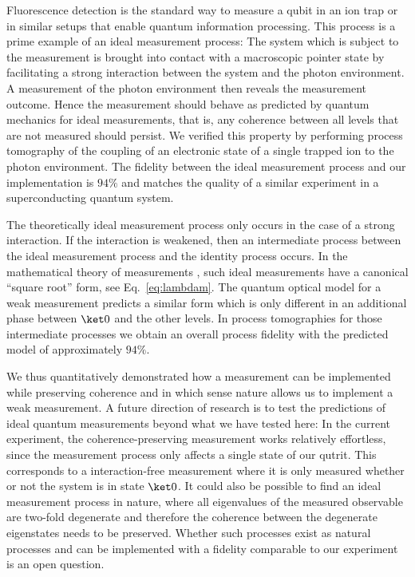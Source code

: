 \documentclass[12pt,
onecolumn,
superscriptaddress,
floatfix,
]{revtex4-2}
\begin{document}
Fluorescence detection is the standard way to measure a qubit in an ion trap or 
 in similar setups that enable quantum information processing.
This process is a prime example of an ideal measurement process:
The system which is subject to the measurement is brought into contact with a 
 macroscopic pointer state by facilitating a strong interaction between the system 
 and the photon environment.
A measurement of the photon environment then reveals the measurement outcome.
Hence the measurement should behave as predicted by quantum mechanics for 
 ideal measurements, that is, any coherence between all levels 
 that are not measured should persist.
We verified this property by 
 performing process tomography of the coupling of an electronic state of a single trapped ion to the photon environment.
The fidelity between the ideal measurement process and our implementation is 
 $94\%$ and matches the quality of a similar experiment \cite{Jerger16} in a 
 superconducting quantum system.

The theoretically ideal measurement process only occurs in the case of a strong 
 interaction.
If the interaction is weakened, then an intermediate process between the ideal 
 measurement process and the identity process occurs.
In the mathematical theory of measurements \cite{Heinosaari12}, such ideal 
 measurements have a canonical ``square root'' form, see 
 Eq.~\eqref{eq:lambdam}.
The quantum optical model for a weak measurement predicts a 
 similar form which is only different in an additional phase between $\ket0$ 
 and the other levels.
In process tomographies for those intermediate processes we obtain an overall process 
 fidelity with the predicted model of approximately $94\%$.

We thus quantitatively demonstrated how a measurement can be implemented while 
 preserving coherence and in which sense nature allows us to implement a weak 
 measurement.
A future direction of research is to test the predictions of ideal quantum 
 measurements beyond what we have tested here:
In the current experiment, the coherence-preserving measurement works 
 relatively effortless, since the measurement process only affects a 
 single state of our qutrit.
This corresponds to a interaction-free measurement where it is only measured whether or 
 not the system is in state $\ket 0$.
It could also be possible to find an ideal measurement process in nature, where 
 all eigenvalues of the measured observable are two-fold degenerate and 
 therefore the coherence between the degenerate eigenstates needs to be 
 preserved.
Whether such processes exist as natural processes and can be implemented with a 
 fidelity comparable to our experiment is an open question.
\end{document}
